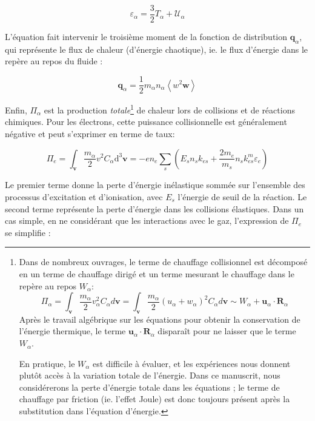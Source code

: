 \begin{refsection}
\begin{equation}
\varepsilon_\alpha=\frac{3}{2}T_\alpha+\mathcal{U}_\alpha
\end{equation}

 L'équation fait intervenir le
troisième moment de la fonction de distribution $\mathbf q_\alpha$, qui
représente le flux de chaleur (d'énergie chaotique), ie. le flux d'énergie dans le repère au repos du fluide :

\begin{equation}
	\mathbf q_\alpha=\frac{1}{2}m_\alpha
	n_\alpha\left<w^2\mathbf w\right>
\end{equation} 

Enfin, $\Pi_\alpha$ est la production \emph{totale}\footnote{Dans de
nombreux ouvrages, le terme de chauffage collisionnel est décomposé en un terme de chauffage dirigé et un terme mesurant
le chauffage dans le repère au repos ${W}_\alpha$:
$$\Pi_\alpha=\int_{\mathbf v}\frac{m_\alpha}{2}v_\alpha^2C_\alpha
d\mathbf v=\int_{\mathbf v}\frac{m_\alpha}{2}(u_\alpha+w_\alpha)^2C_\alpha d\mathbf
v\sim{W}_\alpha+\mathbf u_\alpha\cdot\mathbf R_\alpha $$ Après le
travail algébrique sur les équations pour obtenir la conservation de l'énergie
thermique, le terme $\mathbf u_\alpha\cdot\mathbf R_\alpha$ disparaît pour
ne laisser que le terme ${W}_\alpha$. 

En pratique, le
${W}_\alpha$ est difficile à évaluer, et les expériences nous donnent
plutôt accès à la variation totale de l'énergie.
Dans ce manuscrit, nous
considérerons la perte d'énergie totale dans les équations ; le terme de
chauffage par friction (ie.
l'effet Joule) est donc toujours présent après la substitution dans l'équation d'énergie.} de chaleur lors de collisions et de
réactions chimiques.
Pour les électrons, cette puissance collisionnelle est généralement négative et peut s'exprimer en terme de taux:

\begin{equation}
	\Pi_e=\int_{\mathbf
	v}\frac{m_\alpha}{2}v^2C_\alpha \text{d}^3\mathbf
	v=-en_e\sum_{s}\left(E_sn_sk_{es}+\frac{2m_e}{m_s}n_sk^m_{es}\varepsilon_e\right)
\end{equation}

Le premier terme donne la perte d'énergie inélastique sommée sur l'ensemble
des processus d'excitation et d'ionisation, avec $E_s$ l'énergie de seuil de la
réaction. Le second terme représente la perte d'énergie dans les collisions
élastiques. Dans un cas simple, en ne considérant que les interactions avec le
gaz, l'expression de $\Pi_e$ se simplifie :


\end{refsection}
